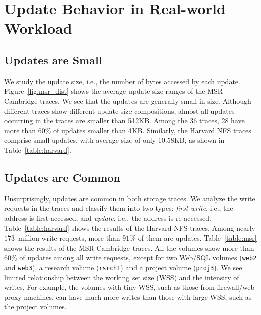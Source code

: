 \section{Update Behavior in Real-world Workload}


\subsection{Updates are Small}  We study the update size, i.e., the number of
bytes accessed by each update.  Figure~\ref{fig:msr_dist} shows the average
update size ranges of the MSR Cambridge traces.  We see that the updates are
generally small in size. Although different traces show different
update size compositions, almost all updates occurring in the traces are smaller than
512KB. Among the 36 traces, 28 have more than $60\%$ of updates
smaller than 4KB. Similarly, the Harvard NFS traces comprise small updates,
with average size of only 10.58KB, as shown in Table~\ref{table:harvard}.

\subsection{Updates are Common} Unsurprisingly, updates are common in both
storage traces.  We analyze the write requests in the traces and classify them
into two types: {\em first-write}, i.e., the address is first accessed, and
{\em update}, i.e., the address is re-accessed.  Table~\ref{table:harvard}
shows the results of the Harvard NFS traces.  Among nearly $173$~million
write requests, more than $91\%$ of them are updates.  Table~\ref{table:msr}
shows the results of the MSR Cambridge traces. All the volumes show more than
$60\%$ of updates among all write requests, except for two Web/SQL volumes
(\texttt{web2} and \texttt{web3}), a research volume (\texttt{rsrch1}) and a
project volume (\texttt{proj3}). We see limited relationship between 
the working set size (WSS) and the intensity of writes.  For example, the
volumes with tiny WSS, such as those from firewall/web proxy machines, can
have much more writes than those with large WSS, such as the project volumes.  



